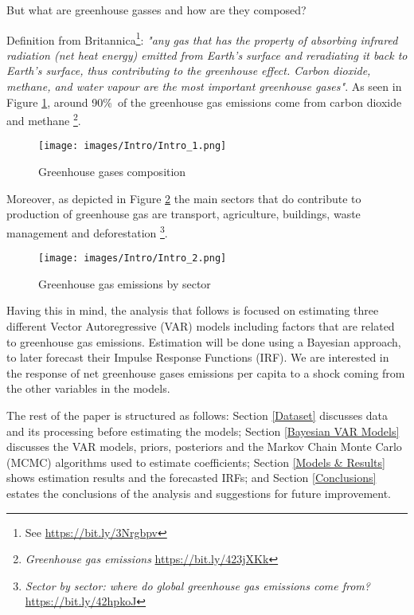 \documentclass[12pt]{article}
\begin{document}
But what are greenhouse gasses and how are they composed? 

Definition from Britannica\footnote{See \url{https://bit.ly/3Nrgbpv}}:  \emph{"any gas that has the property of absorbing infrared radiation (net heat energy) emitted from Earth’s surface and reradiating it back to Earth’s surface, thus contributing to the greenhouse effect. Carbon dioxide, methane, and water vapour are the most important greenhouse gases"}. As seen in Figure \ref{fig:Fig1}, around 90\%\ of the greenhouse gas emissions come from carbon dioxide and methane \footnote{ \emph{Greenhouse gas emissions} \url{https://bit.ly/423jXKk}}. \\

 \begin{figure}[H]
    \centering
    \texttt{[image: images/Intro/Intro\_1.png]}
    \caption{Greenhouse gases composition}
    \label{fig:Fig1}
\end{figure}

Moreover, as depicted in Figure \ref{fig:Fig2} the main sectors that do contribute to production of greenhouse gas are transport, agriculture, buildings, waste management and deforestation \footnote{ \emph{Sector by sector: where do global greenhouse gas emissions come from?} \url{https://bit.ly/42hpkoJ}}.

 \begin{figure}[H]
    \centering
    \texttt{[image: images/Intro/Intro\_2.png]}
    \caption{Greenhouse gas emissions by sector}
    \label{fig:Fig2}
\end{figure}

Having this in mind, the analysis that follows is focused on estimating three different Vector Autoregressive (VAR) models including factors that are related to greenhouse gas emissions. Estimation will be done using a Bayesian approach, to later forecast their Impulse Response Functions (IRF). We are interested in the response of net greenhouse gases emissions per capita to a shock coming from the other variables in the models. 

The rest of the paper is structured as follows: Section \ref{Dataset} discusses data and its processing before estimating the models; Section \ref{Bayesian VAR Models} discusses the VAR models, priors, posteriors and the Markov Chain Monte Carlo (MCMC) algorithms used to estimate coefficients; Section \ref{Models & Results} shows estimation results and the forecasted IRFs; and Section \ref{Conclusions} estates the conclusions of the analysis and suggestions for future improvement.
\end{document}
